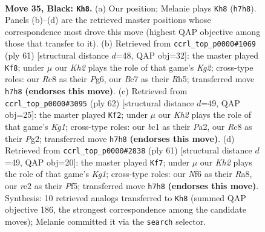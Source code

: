 \documentclass[11pt]{article}
\begin{document}
\clearpage

\begin{figure}[p]\centering
\begin{subfigure}{0.46\textwidth}\centering
\resizebox{\linewidth}{!}{%
\newchessgame
\chessboard[
  setfen={2r5/p1b3pk/P1b2n1p/1p3p2/1P3P2/4P1P1/4R3/RNB3K1 b - - 0 35},
  showmover=false,
  pgfstyle=straightmove, color=movearrow, markmove={h7-h8}
]}
\caption{}
\end{subfigure}\hfill
\begin{subfigure}{0.46\textwidth}\centering
\resizebox{\linewidth}{!}{%
\newchessgame
\chessboard[
  setfen={8/1p3pk1/2b1n1p1/p6r/2P5/PP3P2/5R1P/2K1NB2 b - - 0 31},
  showmover=false,
  pgfstyle=straightmove, color=movearrow, markmove={g7-f8}
]}
\caption{}
\end{subfigure}
\\[4pt]
\begin{subfigure}{0.46\textwidth}\centering
\resizebox{\linewidth}{!}{%
\newchessgame
\chessboard[
  setfen={5k2/1pr2p1p/p3pbp1/8/2P1P3/1P1RB3/P5PP/6K1 w - - 3 32},
  showmover=false,
  pgfstyle=straightmove, color=movearrow, markmove={g1-f2}
]}
\caption{}
\end{subfigure}\hfill
\begin{subfigure}{0.46\textwidth}\centering
\resizebox{\linewidth}{!}{%
\newchessgame
\chessboard[
  setfen={r5k1/1p5p/2b5/p4p2/P2P2p1/2B3P1/1P3P1P/R4K2 b - - 0 31},
  showmover=false,
  pgfstyle=straightmove, color=movearrow, markmove={g8-f7}
]}
\caption{}
\end{subfigure}
\caption{\textbf{Move 35, Black: \texttt{Kh8}.} (a) Our position; Melanie plays \texttt{Kh8} (\texttt{h7h8}). Panels (b)--(d) are the retrieved master positions whose correspondence most drove this move (highest QAP objective among those that transfer to it). (b) Retrieved from \texttt{ccrl\_top\_p0000\#1069} (ply 61) [structural distance $d$=48, QAP obj=32]: the master played \texttt{Kf8}; under $\mu$ our \emph{Kh2} plays the role of that game's \emph{Kg2}; cross-type roles: our \emph{R}c8 as their \emph{P}g6, our \emph{B}c7 as their \emph{R}h5; transferred move \texttt{h7h8} \textbf{(endorses this move)}. (c) Retrieved from \texttt{ccrl\_top\_p0000\#3095} (ply 62) [structural distance $d$=49, QAP obj=25]: the master played \texttt{Kf2}; under $\mu$ our \emph{Kh2} plays the role of that game's \emph{Kg1}; cross-type roles: our \emph{b}c1 as their \emph{P}a2, our \emph{R}c8 as their \emph{P}g2; transferred move \texttt{h7h8} \textbf{(endorses this move)}. (d) Retrieved from \texttt{ccrl\_top\_p0000\#2838} (ply 61) [structural distance $d$=49, QAP obj=20]: the master played \texttt{Kf7}; under $\mu$ our \emph{Kh2} plays the role of that game's \emph{Kg1}; cross-type roles: our \emph{N}f6 as their \emph{R}a8, our \emph{r}e2 as their \emph{P}f5; transferred move \texttt{h7h8} \textbf{(endorses this move)}. Synthesis: 10 retrieved analogs transferred to \texttt{Kh8} (summed QAP objective 186, the strongest correspondence among the candidate moves); Melanie committed it via the \texttt{search} selector.}
\label{fig:thought-m69}
\end{figure}
\end{document}

